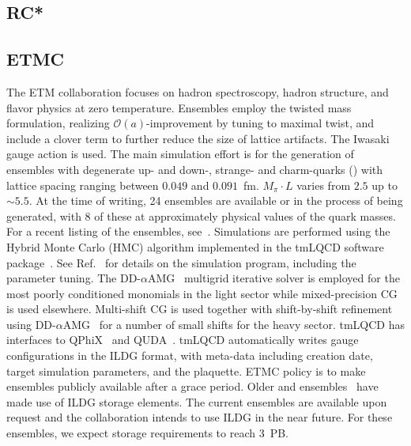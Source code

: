 \documentclass[a4paper,11pt]{article}
\begin{document}
\subsection{RC*}

\subsection{ETMC}
\begin{linenumbers}[1]
The ETM collaboration focuses on hadron spectroscopy, hadron
structure, and flavor physics at zero temperature. Ensembles employ
the twisted mass formulation, realizing $\mathcal{O}(a)$-improvement
by tuning to maximal twist, and include a clover term to further
reduce the size of lattice artifacts. The Iwasaki gauge action is
used. The main simulation effort is for the generation of ensembles
with degenerate up- and down-, strange- and charm-quarks
() with lattice spacing ranging between $0.049$ and
$0.091$~fm. $M_\pi\cdot L$ varies from $2.5$ up to ${\sim}5.5$. At the
time of writing, 24 ensembles are available or in the process of being
generated, with 8 of these at approximately physical values of the
quark masses. For a recent listing of the ensembles,
see~\cite{ETMCPoster:2024}. Simulations are performed using the Hybrid
Monte Carlo (HMC) algorithm implemented in the tmLQCD software
package~\cite{Jansen:2009xp,Deuzeman:2013xaa,Abdel-Rehim:2013wba}. See
Ref.~\cite{Alexandrou:2018egz} for details on the simulation program,
including the parameter tuning. The
DD-$\alpha$AMG~\cite{Frommer:2013fsa,Alexandrou:2016izb} multigrid
iterative solver is employed for the most poorly conditioned monomials
in the light sector while mixed-precision CG is used
elsewhere. Multi-shift CG is used together with shift-by-shift
refinement using DD-$\alpha$AMG~\cite{Alexandrou:2018wiv} for a number
of small shifts for the heavy sector. tmLQCD has interfaces to
QPhiX~\cite{Joo:2013lwm} and QUDA~\cite{Clark:2009wm,Babich:2011np}.
tmLQCD automatically writes gauge configurations in the ILDG format,
with meta-data including creation date, target simulation parameters,
and the plaquette. ETMC policy is to make ensembles publicly
available after a grace period. Older  and 
ensembles~\cite{Baron:2010bv,EuropeanTwistedMass:2010voq,ETM:2009ztk}
have made use of ILDG storage elements. The current ensembles are
available upon request and the collaboration intends to use ILDG in
the near future. For these ensembles, we expect storage requirements
to reach 3~PB.
\end{linenumbers}
\end{document}
